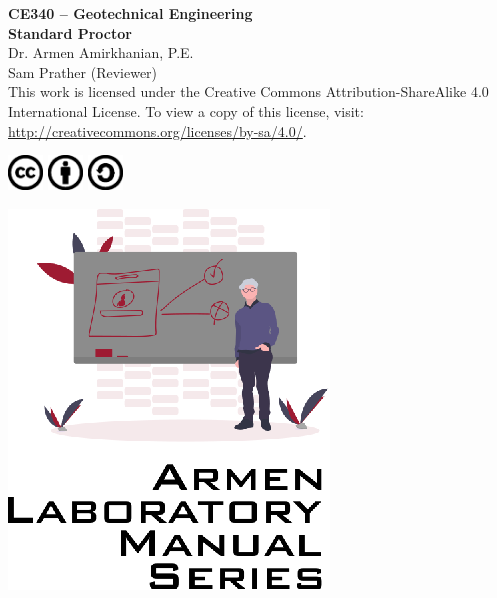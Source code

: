 \documentclass[12pt]{article}
\newcommand{\CourseNum}{CE340}
\newcommand{\CourseName}{Geotechnical Engineering}
\newcommand{\LabTitle}{Standard Proctor}
\begin{document}
\begin{titlepage}
\begin{flushright}
\LARGE{\textbf{\CourseNum{} -- \CourseName}}\\
\vfill
\Huge{\textbf{\LabTitle}}\\
    \vfill
    \large Dr. Armen Amirkhanian, P.E.\\
    \normalsize Sam Prather (Reviewer)\\
\vfill
\normalsize This work is licensed under the Creative Commons Attribution-ShareAlike 4.0 International License. To view a copy of this license, visit:
\href{http://creativecommons.org/licenses/by-sa/4.0/}{http://creativecommons.org/licenses/by-sa/4.0/}.

\includegraphics[width=0.07\textwidth]{cc.eps}
\includegraphics[width=0.07\textwidth]{by.eps}
\includegraphics[width=0.07\textwidth]{sa.eps}
\vfill

\includegraphics[width=0.3\linewidth]{Logo.eps}\\ 
 
  
\end{flushright}
\end{titlepage}
\end{document}
